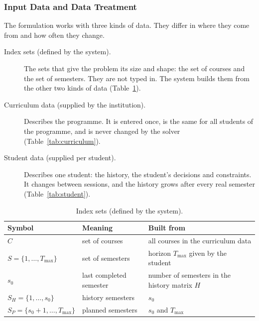 \subsubsection{Input Data and Data Treatment}\label{sec:inputs}

The formulation works with three kinds of data. They differ in where they come from and how often they change.
\begin{description}
  \item[Index sets (defined by the system).] The sets that give the problem its size and shape: the set of courses and the set of semesters. They are not typed in. The system builds them from the other two kinds of data (Table~\ref{tab:index}).
  \item[Curriculum data (supplied by the institution).] Describes the programme. It is entered once, is the same for all students of the programme, and is never changed by the solver (Table~\ref{tab:curriculum}).
  \item[Student data (supplied per student).] Describes one student: the history, the student's decisions and constraints. It changes between sessions, and the history grows after every real semester (Table~\ref{tab:student}).
\end{description}

\begin{table}[ht]
\centering
\small
\begin{tabular}{@{}>{\raggedright\arraybackslash}p{3.9cm}>{\raggedright\arraybackslash}p{4.2cm}>{\raggedright\arraybackslash}p{5.2cm}@{}}
\toprule
\textbf{Symbol} & \textbf{Meaning} & \textbf{Built from} \\
\midrule
$C$ & set of courses & all courses in the curriculum data \\
$S=\{1,\dots,T_{\max}\}$ & set of semesters & horizon $T_{\max}$ given by the student \\
$s_0$ & last completed semester & number of semesters in the history matrix $H$ \\
$S_H=\{1,\dots,s_0\}$ & history semesters & $s_0$ \\
$S_P=\{s_0+1,\dots,T_{\max}\}$ & planned semesters & $s_0$ and $T_{\max}$ \\
\bottomrule
\end{tabular}
\caption{Index sets (defined by the system).}
\label{tab:index}
\end{table}

